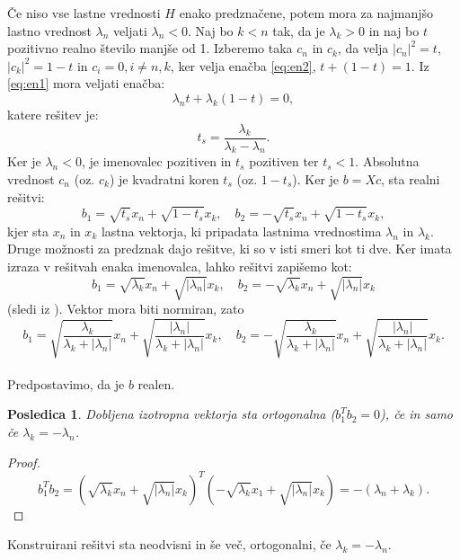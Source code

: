 \documentclass[12pt,a4paper]{amsart}
\theoremstyle{definition}
\theoremstyle{plain}
\newtheorem{posledica}[definicija]{Posledica}
\newcommand{\abs}[1]{ \left\lvert#1\right\rvert}
\begin{document}
Če niso vse lastne vrednosti $H$ enako predznačene, potem mora za najmanjšo lastno vrednost $\lambda_n$ veljati $\lambda_n <0$. 
Naj bo $k<n$ tak, da je $\lambda_k >0$ in naj bo $t$ pozitivno realno število manjše od 1.  Izberemo taka $c_n$ in $c_k$, da velja  $\abs{c_n}^2 =t$, $\abs{c_k}^2=1-t$ in $c_i =0, i\not=n,k$, ker velja enačba \eqref{eq:en2}, $t+ (1-t)=1$. Iz \eqref{eq:en1} mora veljati enačba: $$\lambda_n t +\lambda_k (1-t)=0,$$ katere rešitev je:
\begin{equation}
t_s=\frac{\lambda_k}{\lambda_k -\lambda_n}.
\end{equation}
Ker je $\lambda_n <0$, je imenovalec pozitiven in $t_s$ pozitiven ter $t_s <1$. Absolutna vrednost $c_n$ (oz. $c_k$) je kvadratni koren $t_s$ (oz. $1-t_s$). Ker je $b=Xc$, sta realni rešitvi: $$b_1=\sqrt{t_s}x_n +\sqrt{1-t_s}x_k,\quad b_2=-\sqrt{t_s}x_n+\sqrt{1-t_s}x_k,$$ kjer sta $x_n$ in $x_k$ lastna vektorja, ki pripadata lastnima vrednostima $\lambda_n$ in $\lambda_k$. Druge možnosti za predznak dajo rešitve, ki so v isti smeri kot ti dve. Ker imata izraza v rešitvah enaka imenovalca, lahko rešitvi zapišemo kot: $$b_1=\sqrt{\lambda_k}x_n+\sqrt{\abs{\lambda_n}}x_k, \quad b_2=-\sqrt{\lambda_k}x_n+\sqrt{\abs{\lambda_n}}x_k$$(sledi iz \cite{lipkin}).  Vektor mora biti normiran, zato
 $$b_1=\sqrt{\frac{\lambda_k}{\lambda_k +\abs{\lambda_n}}}x_n + \sqrt{\frac{\abs{\lambda_n}}{\lambda_k +\abs{\lambda_n}}}x_k,\quad b_2=-\sqrt{\frac{\lambda_k}{\lambda_k +\abs{\lambda_n}}}x_n + \sqrt{\frac{\abs{\lambda_n}}{\lambda_k +\abs{\lambda_n}}}x_k.$$ \\%

Predpostavimo, da je $b$ realen.
\begin{posledica}\cite{lipkin}
Dobljena izotropna vektorja sta ortogonalna ($b_1 ^T b_2=0$), če in samo če $\lambda_k=-\lambda_n$.
\end{posledica}
\begin{proof}%
$$b_1 ^T b_2=(\sqrt{\lambda_k}x_n+\sqrt{\abs{\lambda_n}}x_k)^T (-\sqrt{\lambda_k}x_1+\sqrt{\abs{\lambda_n}}x_k )= -(\lambda_n +\lambda_k).$$
\end{proof} 
Konstruirani rešitvi sta neodvisni in še več, ortogonalni, če $\lambda_k =-\lambda_n$. \\
\end{document}
